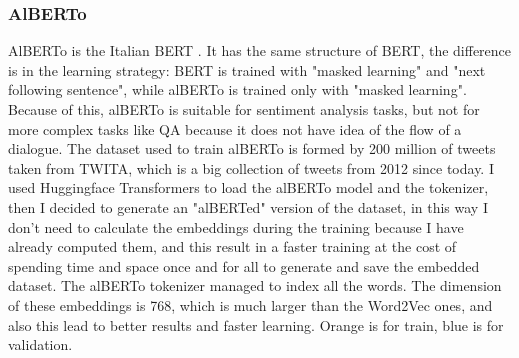 \documentclass{article}
\begin{document}
            \subsubsection{AlBERTo}
            AlBERTo is the Italian BERT .
            It has the same structure of BERT, the difference is in the learning strategy: BERT is trained with "masked learning" and "next following sentence",
            while alBERTo is trained only with "masked learning".
            Because of this, alBERTo is suitable for sentiment analysis tasks, but not for more complex tasks like QA because it does not have idea of the flow of a dialogue.
            The dataset used to train alBERTo is formed by 200 million of tweets taken from TWITA, which is a big collection of tweets from 2012 since today.
            I used Huggingface Transformers to load the alBERTo model and the tokenizer, then I decided to generate an "alBERTed" version of the dataset,
            in this way I don't need to calculate the embeddings during the training because I have already computed them,
            and this result in a faster training at the cost of spending time and space once and for all to generate and save the embedded dataset.
            The alBERTo tokenizer managed to index all the words.
            The dimension of these embeddings is 768, which is much larger than the Word2Vec ones, and also this lead to better results and faster learning.
            \color{orange} Orange is for train, \color{blue} blue is for validation.\color{black}
\end{document}
